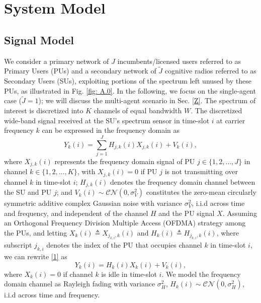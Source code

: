 \documentclass[10pt, twocolumn]{IEEEtran}
\begin{document}
\section{System Model}\label{I}
\subsection{Signal Model}\label{I.I}
We consider a primary network of $J$ incumbents/licensed users referred to as Primary Users (PUs) and a secondary network of $\tilde J$ cognitive radios referred to as Secondary Users (SUs),  exploiting portions of the spectrum left unused by these PUs, as illustrated in Fig. \ref{fig: A.0}. In the following, we focus on the single-agent case ($\tilde J=1$); we will discuss the multi-agent scenario in Sec. \ref{Z}. The spectrum of interest is discretized into $K$ channels of equal bandwidth $W$. The discretized wide-band signal received at the SU's spectrum sensor in time-slot $i$ at carrier frequency $k$ can be expressed in the frequency domain as
\begin{equation}\label{1}
    Y_{k}(i)=\sum_{j{=}1}^{J}{H_{j,k}(i)X_{j,k}(i)+V_{k}(i)},
\end{equation}
where $X_{j,k}(i)$ represents the frequency domain signal of PU $j{\in}\{1,2,\dots,J\}$ in channel $k \in \{1,2,\dots,K\}$, with $X_{j,k}(i){=}0$ if PU $j$ is not transmitting over channel $k$ in time-slot $i$; $H_{j,k}(i)$ denotes the frequency domain channel between the SU and PU $j$; and $V_{k}(i){\sim}\mathcal{CN}(0,\sigma_{V}^{2})$ constitutes the zero-mean circularly symmetric additive complex Gaussian noise with variance $\sigma_{V}^{2}$, i.i.d across time and frequency, and independent of the channel $H$ and the PU signal $X$. Assuming an Orthogonal Frequency Division Multiple Access (OFDMA) strategy among the PUs, and letting $X_{k}(i){\triangleq}X_{j_{k,i},k}(i)$ and $H_{k}(i){\triangleq}H_{j_{k,i},k}(i)$, where subscript $j_{k,i}$ denotes the index of the PU that occupies channel $k$ in time-slot $i$, we can rewrite \eqref{1} as
\begin{equation}\label{2}
    Y_{k}(i)=H_{k}(i)X_{k}(i)+V_{k}(i),
\end{equation}
where $X_{k}(i){=}0$ if channel $k$ is idle in time-slot $i$. We model the frequency domain channel as Rayleigh fading with variance $\sigma_{H}^{2}$, $H_{k}(i) \sim \mathcal{CN}(0,\sigma_{H}^{2})$, i.i.d across time and frequency.
\vspace{-7mm}
\end{document}
